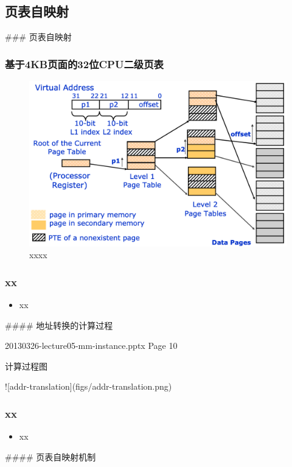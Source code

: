 \subsection{页表自映射} %
### 页表自映射
\begin{frame}
    \frametitle{基于4KB页面的32位CPU二级页表}
    \begin{figure}
    \includegraphics[width=0.8\linewidth]{figs/2-level-pagetable.png}
    \caption{xxxx}
    \end{figure}
\end{frame}

% 
% 
% 
\begin{frame}
    \frametitle{xx}
    \begin{itemize}
        \item xx
    \end{itemize}
\end{frame}
#### 地址转换的计算过程

20130326-lecture05-mm-instance.pptx
Page 10

计算过程图

![addr-translation](figs/addr-translation.png)

\begin{frame}
    \frametitle{xx}
    \begin{itemize}
        \item xx
    \end{itemize}
\end{frame}
#### 页表自映射机制

